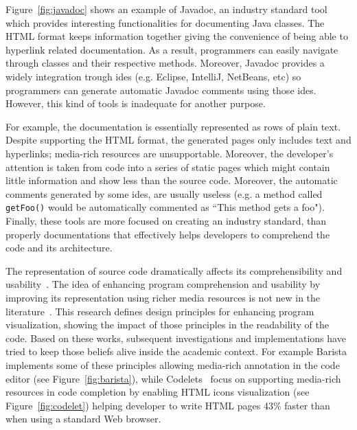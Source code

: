 Figure~\ref{fig:javadoc} shows an example of Javadoc, an industry standard tool which provides interesting functionalities for documenting Java classes. The HTML format keeps information together giving the convenience of being able to hyperlink related documentation. As a result, programmers can easily navigate through classes and their respective methods. Moreover, Javadoc provides a widely integration trough \glspl{ide} (e.g. Eclipse, IntelliJ, NetBeans, etc) so programmers can generate automatic Javadoc comments using those \glspl{ide}. However, this kind of tools is inadequate for another purpose.

For example, the documentation is essentially represented as rows of plain text. Despite supporting the HTML format, the generated pages only includes text and hyperlinks; media-rich resources are unsupportable. Moreover, the developer's attention is taken from code into a series of static pages which might contain little information and show less than the source code. Moreover, the automatic comments generated by some \glspl{ide}, are usually useless (e.g. a method called \texttt{getFoo()} would be automatically commented as ``This method gets a foo"). Finally, these tools are more focused on creating an industry standard, than properly documentations that effectively helps developers to comprehend the code and its architecture.

The representation of source code dramatically affects its comprehensibility and usability~\citep{baecker1986design}. The idea of enhancing program comprehension and usability by improving its representation using richer media resources is not new in the literature~\citep{marcus1982graphic,baecker1986design,baecker1983enhancing}. This research defines design principles for enhancing program visualization, showing the impact of those principles in the readability of the code. Based on these works, subsequent investigations and implementations have tried to keep those beliefs alive inside the academic context. For example Barista~\citep{ko2006barista} implements some of these principles  allowing media-rich annotation in the code editor (see Figure~\ref{fig:barista}), while Codelets~\citep{oney2012codelets} focus on supporting media-rich resources in code completion by enabling HTML icons visualization (see Figure~\ref{fig:codelet}) helping developer to write HTML pages 43\% faster than when using a standard Web browser\citep{oney2012codelets}.

